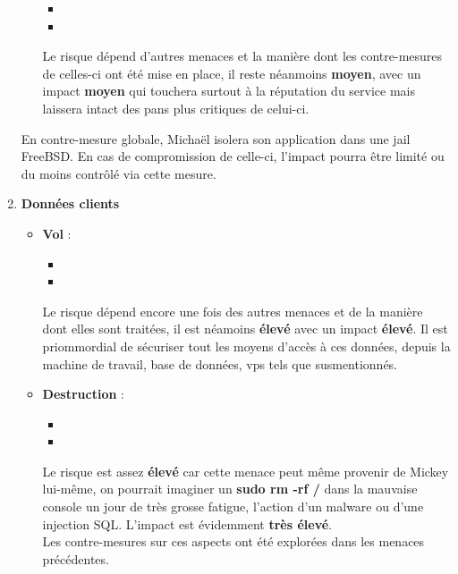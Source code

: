\documentclass[a4paper,10pt,final,fleqn]{article}
\begin{document}
\begin{enumerate}
\begin{itemize}
								\begin{itemize}
									\item 
									\item 
								\end{itemize}

							Le risque dépend d'autres menaces et la manière dont les contre-mesures de celles-ci ont été mise en place, il reste néanmoins \textbf{moyen}, avec un impact \textbf{moyen} qui touchera surtout à la réputation du service mais laissera intact des pans plus critiques de celui-ci.\\

						\end{itemize}

						En contre-mesure globale, Michaël isolera son application dans une jail FreeBSD. En cas de compromission de celle-ci, l'impact pourra être limité ou du moins contrôlé via cette mesure. 
						
					\item \textbf{Données clients}

						\begin{itemize}
							\item \textbf{Vol} : \\

								\begin{itemize}
									\item 
									\item 
								\end{itemize}

							Le risque dépend encore une fois des autres menaces et de la manière dont elles sont traitées, il est néamoins \textbf{élevé} avec un impact \textbf{élevé}. Il est priommordial de sécuriser tout les moyens d'accès à ces données, depuis la machine de travail, base de données, vps tels que susmentionnés.\\
							\item \textbf{Destruction} : \\

								\begin{itemize}
									\item 
									\item 
								\end{itemize}

							Le risque est assez \textbf{élevé} car cette menace peut même provenir de Mickey lui-même, on pourrait imaginer un \textbf{sudo rm -rf /} dans la mauvaise console un jour de très grosse fatigue, l'action d'un malware ou d'une injection SQL. L'impact est évidemment \textbf{très élevé}.\\
							Les contre-mesures sur ces aspects ont été explorées dans les menaces précédentes.\\
						\end{itemize}
						

\end{enumerate}
\end{document}
